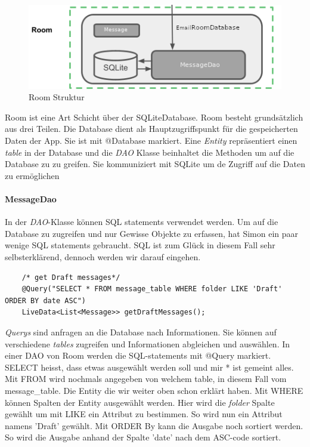 \documentclass[a4paper,11pt]{article}
\begin{document}
\begingroup
\setlength{\intextsep}{10pt}
\setlength{\columnsep}{15pt}

\begin{figure}
    \centering
    \includegraphics[width=.4\textwidth]{media/RoomStructure.png}
    \caption{Room Struktur \cite{appStructurePicture}}
\end{figure}


Room ist eine Art Schicht über der SQLiteDatabase. 
Room besteht grundsätzlich aus drei Teilen. Die Database dient als Hauptzugriffspunkt für die gespeicherten Daten der App. Sie ist mit @Database markiert. 
Eine \textit{Entity} repräsentiert einen \textit{table} in der Database und die \textit{DAO} Klasse beinhaltet die Methoden um auf die Database zu zu greifen. Sie kommuniziert
mit SQLite um de Zugriff auf die Daten zu ermöglichen \cite{roomStructure}


\paragraph{MessageDao}

In der \textit{DAO}-Klasse können SQL statements verwendet werden. Um auf die Database zu zugreifen und nur Gewisse 
Objekte zu erfassen, hat Simon ein paar wenige SQL statements gebraucht. SQL ist zum Glück in diesem Fall sehr selbsterklärend, 
dennoch werden wir darauf eingehen.\\


\lstset{language=SQL}
\begin{lstlisting}
    /* get Draft messages*/
    @Query("SELECT * FROM message_table WHERE folder LIKE 'Draft' ORDER BY date ASC")
    LiveData<List<Message>> getDraftMessages();
\end{lstlisting}

\textit{Querys} sind anfragen an die Database nach Informationen. Sie können auf verschiedene \textit{tables} zugreifen und Informationen abgleichen und auswählen. 
In einer DAO von Room werden die SQL-statements mit @Query markiert. SELECT heisst, dass etwas ausgewählt werden soll und mir * ist gemeint alles. Mit FROM wird nochmals angegeben von 
welchem table, in diesem Fall vom message\_table. Die Entity die wir weiter oben schon erklärt haben. Mit WHERE können Spalten der Entity ausgewählt werden. Hier wird die \textit{folder} Spalte 
gewählt um mit LIKE ein Attribut zu bestimmen. So wird nun ein Attribut namens 'Draft' gewählt. Mit ORDER By kann die Ausgabe noch sortiert werden. So wird die Ausgabe anhand der Spalte 'date'
nach dem ASC-code sortiert. \cite{appStructure}
\end{document}
